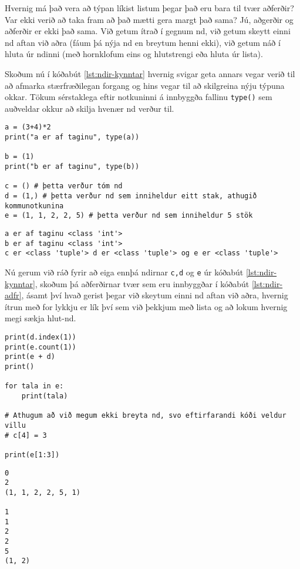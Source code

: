 Hvernig má það vera að týpan líkist listum þegar það eru bara til tvær aðferðir?
Var ekki verið að taka fram að það mætti gera margt það sama?
Jú, aðgerðir og aðferðir er ekki það sama.
Við getum ítrað í gegnum nd, við getum skeytt einni nd aftan við aðra (fáum þá nýja nd en breytum henni ekki), við getum náð í hluta úr ndinni (með hornklofum eins og hlutstrengi eða hluta úr lista).

Skoðum nú í kóðabút \ref{lst:ndir-kynntar} hvernig svigar geta annars vegar verið til að afmarka stærfræðilegan forgang og hins vegar til að skilgreina nýju týpuna okkar.
Tökum sérstaklega eftir notkuninni á innbyggða fallinu \texttt{type()} sem auðveldar okkur að skilja hvenær nd verður til.

\begin{lstlisting}[caption=Ndir skilgreindar, label=lst:ndir-kynntar]
a = (3+4)*2
print("a er af taginu", type(a))

b = (1)
print("b er af taginu", type(b))

c = () # þetta verður tóm nd
d = (1,) # þetta verður nd sem inniheldur eitt stak, athugið kommunotkunina
e = (1, 1, 2, 2, 5) # þetta verður nd sem inniheldur 5 stök
\end{lstlisting}
\lstset{style=uttak}
\begin{lstlisting}
a er af taginu <class 'int'>
b er af taginu <class 'int'>
c er <class 'tuple'> d er <class 'tuple'> og e er <class 'tuple'>
\end{lstlisting}
\lstset{style=venjulegt}

Nú gerum við ráð fyrir að eiga ennþá ndirnar \texttt{c,d} og \texttt{e} úr kóðabút \ref{lst:ndir-kynntar}, skoðum þá aðferðirnar tvær sem eru innbyggðar í kóðabút \ref{lst:ndir-adfr}, ásamt því hvað gerist þegar við skeytum einni nd aftan við aðra, hvernig ítrun með for lykkju er lík því sem við þekkjum með lista og að lokum hvernig megi sækja hlut-nd.

\begin{lstlisting}[caption=Ndir aðgerðir og aðferðir , label=lst:ndir-adfr]
print(d.index(1))
print(e.count(1)) 
print(e + d)
print()

for tala in e:
	print(tala)

# Athugum að við megum ekki breyta nd, svo eftirfarandi kóði veldur villu
# c[4] = 3

print(e[1:3])
\end{lstlisting}
\lstset{style=uttak}
\begin{lstlisting}
0
2
(1, 1, 2, 2, 5, 1)

1
1
2
2
5
(1, 2)
\end{lstlisting}
\lstset{style=venjulegt}



